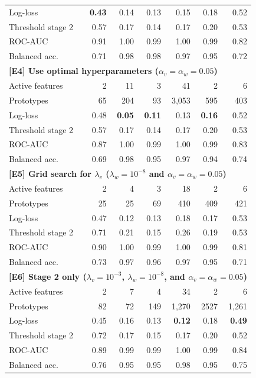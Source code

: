 \begin{table}
\begin{center}
\begin{tabular}{|lrrrrrr|}
Log-loss&\textbf{0.43}&0.14&0.13&0.15&0.18&0.52\\
Threshold stage 2&0.57&0.17&0.14&0.17&0.20&0.53\\
ROC-AUC&0.91&1.00&0.99&1.00&0.99&0.82\\
Balanced acc.&0.71&0.98&0.98&0.97&0.95&0.72\\
\multicolumn{7}{|l|}{\textbf{[E4] Use optimal hyperparameters ($\alpha_v=\alpha_w=0.05$)}}\\
Active features&2&11&3&41&2&6\\
Prototypes&65&204&93&3,053&595&403\\
Log-loss&0.48&\textbf{0.05}&\textbf{0.11}&0.13&\textbf{0.16}&0.52\\
Threshold stage 2&0.57&0.17&0.14&0.17&0.20&0.53\\
ROC-AUC&0.87&1.00&0.99&1.00&0.99&0.83\\
Balanced acc.&0.69&0.98&0.95&0.97&0.94&0.74\\
\multicolumn{7}{|l|}{\textbf{[E5] Grid search for $\lambda_v$ ($\lambda_w=10^{-8}$ and $\alpha_v=\alpha_w=0.05$)}}\\
Active features&2&4&3&18&2&6\\
Prototypes&25&25&69&410&409&421\\
Log-loss&0.47&0.12&0.13&0.18&0.17&0.53\\
Threshold stage 2&0.71&0.21&0.15&0.26&0.19&0.53\\
ROC-AUC&0.90&1.00&0.99&1.00&0.99&0.81\\
Balanced acc.&0.73&0.97&0.96&0.97&0.95&0.71\\
\multicolumn{7}{|l|}{\textbf{[E6] Stage 2 only  ($\lambda_v=10^{-3}$, $\lambda_w=10^{-8}$, and $\alpha_v=\alpha_w=0.05$)}}\\
Active features&2&7&4&34&2&6\\
Prototypes&82&72&149&1,270&2527&1,261\\
Log-loss&0.45&0.16&0.13&\textbf{0.12}&0.18&\textbf{0.49}\\
Threshold stage 2&0.72&0.17&0.15&0.17&0.20&0.52\\
ROC-AUC&0.89&0.99&0.99&1.00&0.99&0.84\\
Balanced acc.&0.76&0.95&0.95&0.98&0.95&0.75\\
\hline
\end{tabular}
\end{center}
\end{table}
%
\clearpage
%
